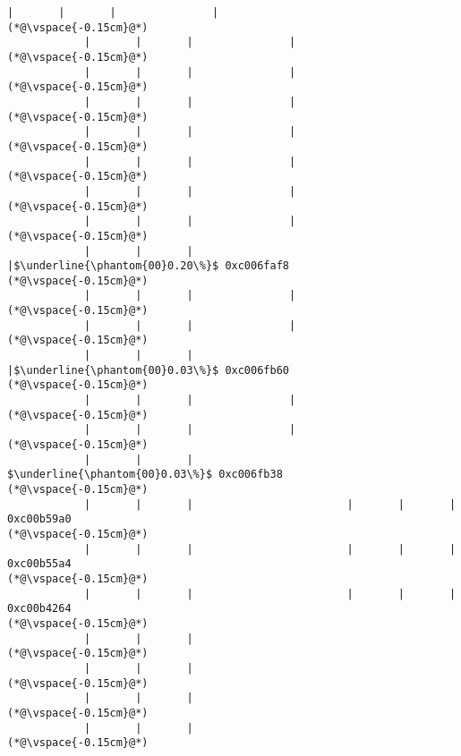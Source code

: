 \begin{lstlisting}[caption=20 viiteparametria Java$\to$C , label=profile:J2CBenchmark00206, numberbychapter=true, frame=lines, float, floatplacement=t]
            |       |       |               |
(*@\vspace{-0.15cm}@*)
            |       |       |               |
(*@\vspace{-0.15cm}@*)
            |       |       |               |
(*@\vspace{-0.15cm}@*)
            |       |       |               |
(*@\vspace{-0.15cm}@*)
            |       |       |               |
(*@\vspace{-0.15cm}@*)
            |       |       |               |
(*@\vspace{-0.15cm}@*)
            |       |       |               |
(*@\vspace{-0.15cm}@*)
            |       |       |               |
(*@\vspace{-0.15cm}@*)
            |       |       |               |$\underline{\phantom{00}0.20\%}$ 0xc006faf8
(*@\vspace{-0.15cm}@*)
            |       |       |               |
(*@\vspace{-0.15cm}@*)
            |       |       |               |
(*@\vspace{-0.15cm}@*)
            |       |       |               |$\underline{\phantom{00}0.03\%}$ 0xc006fb60
(*@\vspace{-0.15cm}@*)
            |       |       |               |
(*@\vspace{-0.15cm}@*)
            |       |       |               |
(*@\vspace{-0.15cm}@*)
            |       |       |                $\underline{\phantom{00}0.03\%}$ 0xc006fb38
(*@\vspace{-0.15cm}@*)
            |       |       |                        |       |       |                       0xc00b59a0
(*@\vspace{-0.15cm}@*)
            |       |       |                        |       |       |                       0xc00b55a4
(*@\vspace{-0.15cm}@*)
            |       |       |                        |       |       |                       0xc00b4264
(*@\vspace{-0.15cm}@*)
            |       |       |
(*@\vspace{-0.15cm}@*)
            |       |       |
(*@\vspace{-0.15cm}@*)
            |       |       |
(*@\vspace{-0.15cm}@*)
            |       |       |
(*@\vspace{-0.15cm}@*)

\end{lstlisting}
